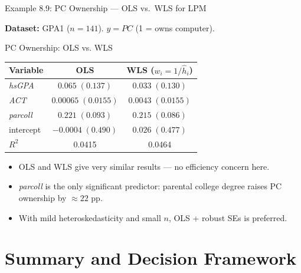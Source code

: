 \documentclass[aspectratio=169, 12pt]{beamer}
\begin{document}
\begin{frame}{Example 8.9: PC Ownership — OLS vs.\ WLS for LPM}

  \textbf{Dataset:} GPA1 ($n=141$). $y = \textit{PC}$ (1 = owns computer).

  \begin{examplebox}{PC Ownership: OLS vs. WLS}
    \begin{center}
      \footnotesize
      \begin{tabular}{lcc}
        \toprule
        Variable & OLS & WLS ($w_i = 1/\hat{h}_i$) \\
        \midrule
        \textit{hsGPA}  & $0.065\;(0.137)$   & $0.033\;(0.130)$ \\
        \textit{ACT}    & $0.00065\;(0.0155)$ & $0.0043\;(0.0155)$ \\
        \textit{parcoll}& $0.221\;(0.093)$   & $0.215\;(0.086)$ \\
        intercept       & $-0.0004\;(0.490)$ & $0.026\;(0.477)$ \\
        \midrule
        $R^2$ & 0.0415 & 0.0464 \\
        \bottomrule
      \end{tabular}
    \end{center}
  \end{examplebox}

  \begin{keybox}
    \begin{itemize}
      \item OLS and WLS give very similar results — no efficiency concern here.
      \item \textit{parcoll} is the only significant predictor: parental college degree raises PC ownership by $\approx 22$ pp.
      \item With mild heteroskedasticity and small $n$, OLS + robust SEs is preferred.
    \end{itemize}
  \end{keybox}

\end{frame}

\section{Summary and Decision Framework}
\end{document}
